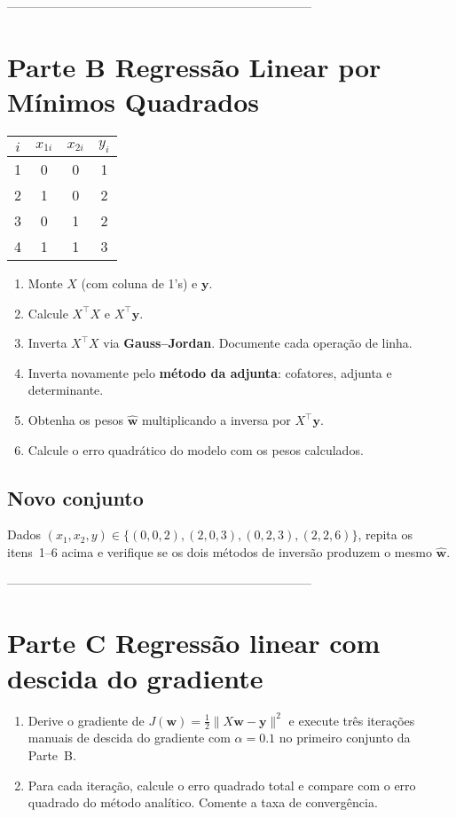 \documentclass[12pt]{article}
\begin{document}
--------------------------------------------------------------------------
\section*{Parte B \;\textemdash\; Regressão Linear por Mínimos Quadrados}

\begin{center}
\begin{tabular}{cccc}
\toprule
\(i\) & \(x_{1i}\) & \(x_{2i}\) & \(y_i\)\\
\midrule
1 & 0 & 0 & 1\\
2 & 1 & 0 & 2\\
3 & 0 & 1 & 2\\
4 & 1 & 1 & 3\\
\bottomrule
\end{tabular}
\end{center}

\begin{enumerate}
  \item Monte \(X\) (com coluna de 1’s) e \(\bm y\).
  \item Calcule \(X^{\!\top}X\) e \(X^{\!\top}\bm y\).
  \item Inverta \(X^{\!\top}X\) via \textbf{Gauss--Jordan}. Documente cada operação de linha.
  \item Inverta novamente pelo \textbf{método da adjunta}: cofatores, adjunta e determinante.
  \item Obtenha os pesos \(\hat{\bm w}\) multiplicando a inversa por \(X^{\!\top}\bm y\).
  \item Calcule o erro quadrático do modelo com os pesos calculados.
\end{enumerate}

\subsection*{Novo conjunto}

Dados \((x_1,x_2,y)\in\{(0,0,2), (2,0,3), (0,2,3), (2,2,6)\}\), repita os itens~1--6 acima e verifique se os dois métodos de inversão produzem o mesmo \(\hat{\bm w}\).

--------------------------------------------------------------------------
\section*{Parte C \;\textemdash\; Regressão linear com descida do gradiente}

\begin{enumerate}
  \item Derive o gradiente de \(J(\bm w)=\tfrac12\lVert X\bm w-\bm y\rVert^{2}\) e execute três iterações manuais de descida do gradiente com \(\alpha=0.1\) no primeiro conjunto da Parte~B.
  \item Para cada iteração, calcule o erro quadrado total e compare com o erro quadrado do método analítico. Comente a taxa de convergência.
\end{enumerate}
\end{document}
